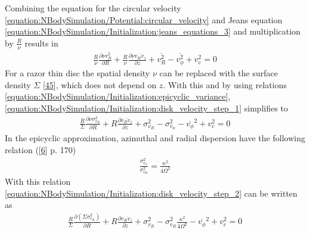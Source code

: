 \documentclass[letterpaper,10pt,english]{sphinxmanual}
\begin{document}
					\sphinxAtStartPar
					Combining the equation for the circular velocity \eqref{equation:NBodySimulation/Potential:circular_velocity} and Jeans equation \eqref{equation:NBodySimulation/Initialization:jeans_equations_3} and multiplication by \(\frac{R}{\nu}\) results in
					\begin{equation}\label{equation:NBodySimulation/Initialization:disk_velocity_step_1}
					\begin{split}\frac{R}{\nu} \frac{\partial \nu \overline{v_R^2}}{\partial R}
					+ \frac{R}{\nu} \frac{\partial \nu \overline{v_Rv_z}}{\partial z}
					+ \overline{v_R^2}-\overline{v_\phi^2} + v_c^2 = 0\end{split}
					\end{equation}
					\sphinxAtStartPar
					For a razor thin disc the spatial density \(\nu\) can be replaced with the surface density \(\Sigma\) {[}\hyperlink{cite.NBodySimulation/Appendix:id19}{45}{]},
					which does not depend on \(z\). With this and by using relations \eqref{equation:NBodySimulation/Initialization:epicyclic_variance}, \eqref{equation:NBodySimulation/Initialization:disk_velocity_step_1} simplifies to
					\begin{equation}\label{equation:NBodySimulation/Initialization:disk_velocity_step_2}
					\begin{split}\frac{R}{\Sigma} \frac{\partial \nu \sigma_{v_{R}}^2}{\partial R}
					+ R \frac{\partial \overline{v_Rv_z}}{\partial z}
					+ \sigma_{v_{R}}^2 -\sigma_{v_{\phi}}^2  - \overline{v_\phi}^2 + v_c^2 = 0\end{split}
					\end{equation}
					\sphinxAtStartPar
					In the epicyclic approximation, azimuthal and radial dispersion have the following relation ({[}\hyperlink{cite.NBodySimulation/Appendix:id17}{6}{]} p. 170)
					\begin{equation}\label{equation:NBodySimulation/Initialization:azimuthal_velocity_dispersion}
					\begin{split}\frac{\sigma_{v_{\phi}}^2}{\sigma_{v_{R}}^2} = \frac{\kappa^2}{4\Omega^2}\end{split}
					\end{equation}
					\sphinxAtStartPar
					With this relation \eqref{equation:NBodySimulation/Initialization:disk_velocity_step_2} can be written as
					\begin{equation*}
					\begin{split}\frac{R}{\Sigma} \frac{\partial  \left ( \Sigma \sigma_{v_{R}}^2 \right ) }{\partial R}
					+ R \frac{\partial \overline{v_Rv_z}}{\partial z}
					+ \sigma_{v_{R}}^2
					- \sigma_{v_{R}}^2 \frac{\kappa^2}{4\Omega^2}
					- \overline{v_\phi}^2 + v_c^2 = 0\end{split}
					\end{equation*}
\end{document}
